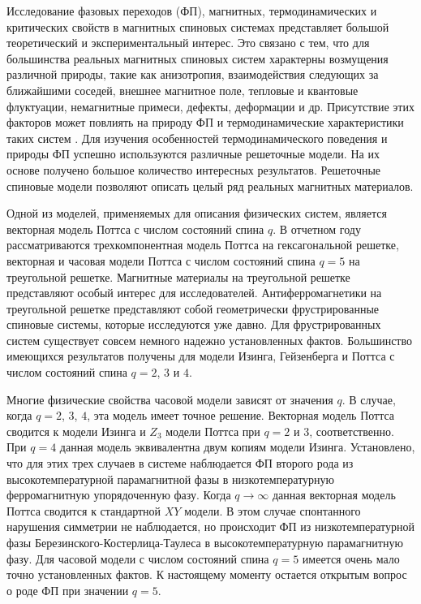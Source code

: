 Исследование фазовых переходов (ФП), магнитных, термодинамических и критических свойств в магнитных спиновых системах представляет большой теоретический и экспериментальный интерес. Это связано с тем, что для большинства реальных магнитных спиновых систем характерны возмущения различной природы, такие как анизотропия, взаимодействия следующих за ближайшими соседей, внешнее магнитное поле, тепловые и квантовые флуктуации, немагнитные примеси, дефекты, деформации и др. Присутствие этих факторов может повлиять на природу ФП и термодинамические характеристики таких систем \cite{bib:mma-1, bib:mma-2, bib:mma-3, bib:mma-4, bib:mma-5, bib:mma-6, bib:mma-7, bib:mma-8, bib:mma-9, bib:mma-10, bib:mma-11}. Для изучения особенностей термодинамического поведения и природы ФП успешно используются различные решеточные модели. На их основе получено большое количество интересных результатов. Решеточные спиновые модели позволяют описать целый ряд реальных магнитных материалов.

Одной из моделей, применяемых для описания физических систем, является векторная модель Поттса с числом состояний спина $q$. В отчетном году рассматриваются трехкомпонентная модель Поттса на гексагональной решетке, векторная и часовая модели Поттса с числом состояний спина $q=5$ на треугольной решетке. Магнитные материалы на треугольной решетке представляют особый интерес для исследователей. Антиферромагнетики на треугольной решетке представляют собой геометрически фрустрированные спиновые системы, которые исследуются уже давно. Для фрустрированных систем существует совсем немного надежно установленных фактов. Большинство имеющихся результатов получены для модели Изинга, Гейзенберга и Поттса с числом состояний спина $q = 2$, $3$ и $4$.

Многие физические свойства часовой модели зависят от значения $q$. В случае, когда $q = 2$, $3$, $4$, эта модель имеет точное решение. Векторная модель Поттса сводится к модели Изинга и $Z_3$ модели Поттса при $q = 2$ и $3$, соответственно. При $q = 4$ данная модель эквивалентна двум копиям модели Изинга. Установлено, что для этих трех случаев в системе наблюдается ФП второго рода из высокотемпературной парамагнитной фазы в низкотемпературную ферромагнитную упорядоченную фазу. Когда $q \to \infty$ данная векторная модель Поттса сводится к стандартной $XY$ модели. В этом случае спонтанного нарушения симметрии не наблюдается, но происходит ФП из низкотемпературной фазы Березинского-Костерлица-Таулеса в высокотемпературную парамагнитную фазу. Для часовой модели с числом состояний спина $q = 5$ имеется очень мало точно установленных фактов. К настоящему моменту остается открытым вопрос о роде ФП при значении $q = 5$.

